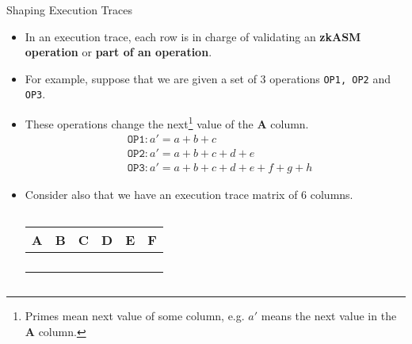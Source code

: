 \begin{frame}{Shaping Execution Traces}
\begin{itemize}
\item In an execution trace, each row is in charge of validating an \textbf{zkASM operation} or \textbf{part of an operation}.
\item For example, suppose that we are given a set of $3$ operations \texttt{OP1, OP2} and \texttt{OP3}.
\item These operations change the next\footnote{Primes mean next value of some column, e.g. $a'$ means the next value in the \textbf{A} column.}
value of the \textbf{A} column.
\begin{align*}
&\texttt{OP1}: a'=a+b+c \\
&\texttt{OP2}: a'=a+b+c+d+e\\
&\texttt{OP3}: a'=a+b+c+d+e+f+g+h
\end{align*}
\item Consider also that we have an execution trace matrix of $6$ columns.

\vspace{0.1cm}
\begin{columns}
\begin{column}{0.4 \textwidth}

\scriptsize

\begin{table}[h!]
\begin{tabular}{|c|c|c|c|c|c|}
\hline
\textbf{A} & \textbf{B} & \textbf{C} & \textbf{D} & \textbf{E} & \textbf{F} \\ \hline
 &  &  & & &\\ \hline
 &  &  &  &  &  \\ \hline
 &  &  &  &  & \\ \hline
 &  &  &&& \\ \hline
\end{tabular}
\end{table}
\end{column}
\end{columns}
\vspace*{5mm}
\end{itemize}
\end{frame}





